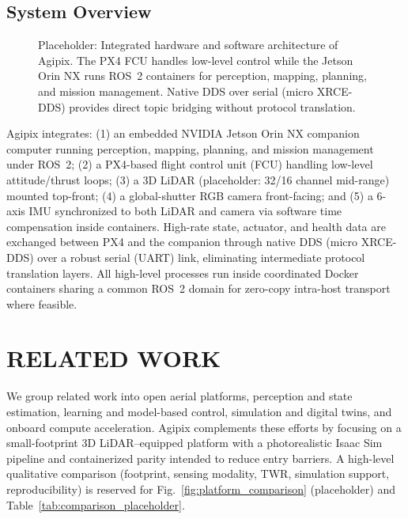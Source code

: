 \documentclass[letterpaper, 10 pt, conference]{ieeeconf}  %
\begin{document}
\subsection{System Overview}
\begin{figure*}[t]
        \centering
        \caption{Placeholder: Integrated hardware and software architecture of Agipix. The PX4 FCU handles low-level control while the Jetson Orin NX runs ROS~2 containers for perception, mapping, planning, and mission management. Native DDS over serial (micro XRCE-DDS) provides direct topic bridging without protocol translation.}
        \label{fig:arch_overview}
\end{figure*}
Agipix integrates: (1) an embedded NVIDIA Jetson Orin NX companion computer running perception, mapping, planning, and mission management under ROS~2; (2) a PX4-based flight control unit (FCU) handling low-level attitude/thrust loops; (3) a 3D LiDAR (placeholder: 32/16 channel mid-range) mounted top-front; (4) a global-shutter RGB camera front-facing; and (5) a 6-axis IMU synchronized to both LiDAR and camera via software time compensation inside containers. High-rate state, actuator, and health data are exchanged between PX4 and the companion through native DDS (micro XRCE-DDS) over a robust serial (UART) link, eliminating intermediate protocol translation layers. All high-level processes run inside coordinated Docker containers sharing a common ROS~2 domain for zero-copy intra-host transport where feasible.

\section{RELATED WORK}
We group related work into open aerial platforms, perception and state estimation, learning and model-based control, simulation and digital twins, and onboard compute acceleration. Agipix complements these efforts by focusing on a small-footprint 3D LiDAR--equipped platform with a photorealistic Isaac Sim pipeline and containerized parity intended to reduce entry barriers. A high-level qualitative comparison (footprint, sensing modality, TWR, simulation support, reproducibility) is reserved for Fig.~\ref{fig:platform_comparison} (placeholder) and Table~\ref{tab:comparison_placeholder}.
\end{document}
